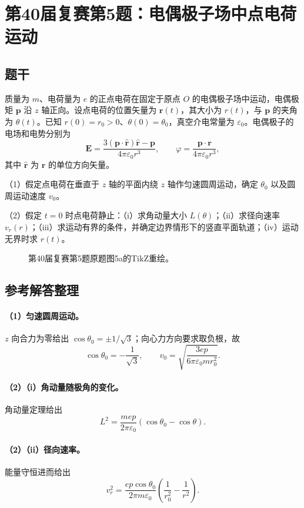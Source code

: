 \section{第40届复赛第5题：电偶极子场中点电荷运动}
\subsection{题干}
质量为 $m$、电荷量为 $e$ 的正点电荷在固定于原点 $O$ 的电偶极子场中运动，电偶极矩 $\boldsymbol p$ 沿 $z$ 轴正向。设点电荷的位置矢量为 $\boldsymbol r(t)$，其大小为 $r(t)$，与 $\boldsymbol p$ 的夹角为 $\theta(t)$。已知 $r(0)=r_0>0$、$\theta(0)=\theta_0$，真空介电常量为 $\varepsilon_0$。电偶极子的电场和电势分别为
\[
\boldsymbol E=\frac{3(\boldsymbol p\cdot\hat{\boldsymbol r})\hat{\boldsymbol r}-\boldsymbol p}
{4\pi\varepsilon_0r^3},
\qquad
\varphi=\frac{\boldsymbol p\cdot\boldsymbol r}{4\pi\varepsilon_0r^3},
\]
其中 $\hat{\boldsymbol r}$ 为 $\boldsymbol r$ 的单位方向矢量。

（1）假定点电荷在垂直于 $z$ 轴的平面内绕 $z$ 轴作匀速圆周运动，确定 $\theta_0$ 以及圆周运动速度 $v_0$。

（2）假定 $t=0$ 时点电荷静止：（i）求角动量大小 $L(\theta)$；（ii）求径向速率 $v_r(r)$；（iii）求运动有界的条件，并确定边界情形下的竖直平面轨道；（iv）运动无界时求 $r(t)$。
\begin{figure}[htbp]\centering\caption{第40届复赛第5题原题图5a的TikZ重绘。}\end{figure}
\subsection{参考解答整理}
\paragraph{（1）匀速圆周运动。} $z$ 向合力为零给出 $\cos\theta_0=\pm1/\sqrt3$；向心力方向要求取负根，故
\[\boxed{\cos\theta_0=-\frac1{\sqrt3},\qquad v_0=\sqrt{\frac{3ep}{6\pi\varepsilon_0mr_0^2}}}.\]
\paragraph{（2）（i）角动量随极角的变化。} 角动量定理给出
\[\boxed{L^2=\frac{mep}{2\pi\varepsilon_0}(\cos\theta_0-\cos\theta)}.\]
\paragraph{（2）（ii）径向速率。}
能量守恒进而给出
\[\boxed{v_r^2=\frac{ep\cos\theta_0}{2\pi m\varepsilon_0}\left(\frac1{r_0^2}-\frac1{r^2}\right)}.\]
